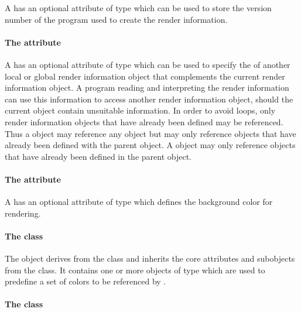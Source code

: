 A \RenderInformationBase has an optional attribute
 of type  which can be used to store 
the version number of the program used to create the render information.

\paragraph{The \fixttspace{} attribute}

A \RenderInformationBase has an optional attribute
 of type  which can be used to 
specify the  of another local or global render information object 
that complements the current render information object. A program reading and 
interpreting the render information can use this information to access another 
render information object, should the current object contain unsuitable information. 
In order to avoid loops, only render information objects that have already been 
defined may be referenced. Thus a \LocalRenderInformation object may reference any 
\GlobalRenderInformation object but may only reference \LocalRenderInformation objects 
that have already been defined with the parent  object. 
A \GlobalRenderInformation object may only reference \GlobalRenderInformation objects 
that have already been defined in the parent  object.


\paragraph{The \fixttspace{} attribute}

A \RenderInformationBase has an optional attribute
 of type  which defines the background 
color for rendering.

\paragraph{The  class}
\label{listofcolordefinitions-class}

The \ListOfColorDefinitions object derives from the  class and
inherits the core attributes and subobjects from the 
class. It contains one or more objects of type \ColorDefinition which are used to predefine a set of colors to be referenced by \Styles. 

\paragraph{The  class}
\label{listofgradientdefinitions-class}

